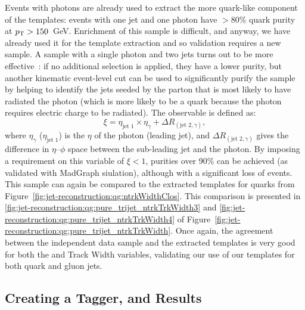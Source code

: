 Events with photons are already used to extract the more quark-like component of the templates: events with one jet and one photon have $>80\%$ quark purity at $p_{\text{T}} > 150$~GeV. Enrichment of this sample is difficult, and anyway, we have already used it for the template extraction and so validation requires a new sample. A sample with a single photon and two jets turns out to be more effective~\cite{schwartz2}: if no additional selection is applied, they have a lower purity, but another kinematic event-level cut can be used to significantly purify the sample by helping to identify the jets seeded by the parton that is most likely to have radiated the photon (which is more likely to be a quark because the photon requires electric charge to be radiated). The observable is defined as:
%
\begin{equation}
\xi=\eta_\text{jet~1}\times\eta_\gamma+\Delta R_{(\text{jet~2},\gamma)},
\end{equation}
%
where $\eta_\gamma$ ($\eta_\text{jet~1}$) is the $\eta$ of the photon (leading jet), and 
$\Delta R_{(\text{jet~2},\gamma)}$ gives the difference in $\eta$--$\phi$ space between the sub-leading 
jet and the photon. By imposing a requirement on this variable of $\xi < 1$, purities over 90\% can be achieved (as validated with MadGraph siulation), although with a significant loss of events. This sample can again be compared to the extracted templates for quarks from Figure~\ref{fig:jet-reconstruction:qg:ntrkWidthClos}. This comparison is presented in \ref{fig:jet-reconstruction:qg:pure_trijet_ntrkTrkWidth3} and \ref{fig:jet-reconstruction:qg:pure_trijet_ntrkTrkWidth4} of Figure~\ref{fig:jet-reconstruction:qg:pure_trijet_ntrkTrkWidth}. Once again, the agreement between the independent data sample and the extracted templates is very good for both the \ntrk and Track Width variables, validating our use of our templates for both quark and gluon jets.

\subsection{Creating a Tagger, and Results}


